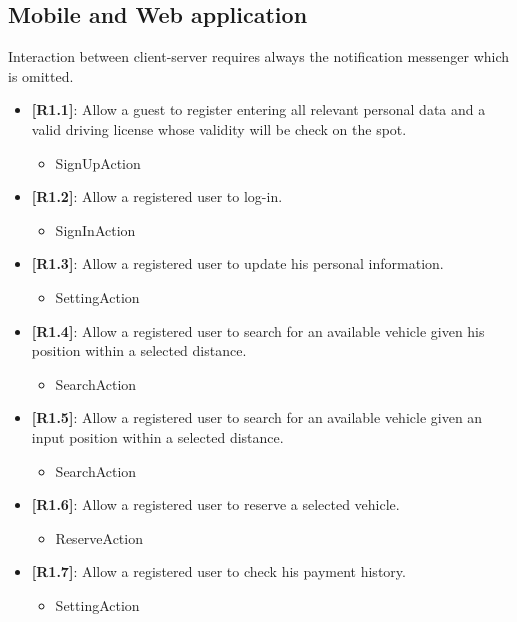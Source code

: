 \subsection{Mobile and Web application}
Interaction between client-server requires always the notification messenger which is omitted.\\
\begin{itemize}
	\item{\textbf{[R1.1]}}: Allow a guest to register entering all relevant personal data and a valid driving license whose validity will be check on the spot.
	\begin{itemize}
	\item SignUpAction
	\end{itemize}
	\item{\textbf{[R1.2]}}: Allow a registered user to log-in.
	\begin{itemize}
	\item SignInAction
	\end{itemize}
	\item{\textbf{[R1.3]}}: Allow a registered user to update his personal information.
	\begin{itemize}
	\item SettingAction
	\end{itemize}
	\item{\textbf{[R1.4]}}: Allow a registered user to search for an available vehicle given his position within a selected distance.
	\begin{itemize}
	\item SearchAction
	\end{itemize}
	\item{\textbf{[R1.5]}}: Allow a registered user to search for an available vehicle given an input position within a selected distance.
	\begin{itemize}
	\item SearchAction
	\end{itemize}
	\item{\textbf{[R1.6]}}: Allow a registered user to reserve a selected vehicle.
	\begin{itemize}
	\item ReserveAction
	\end{itemize}
	\item{\textbf{[R1.7]}}: Allow a registered user to check his payment history.
	\begin{itemize}
	\item SettingAction
	\end{itemize}

\end{itemize}
